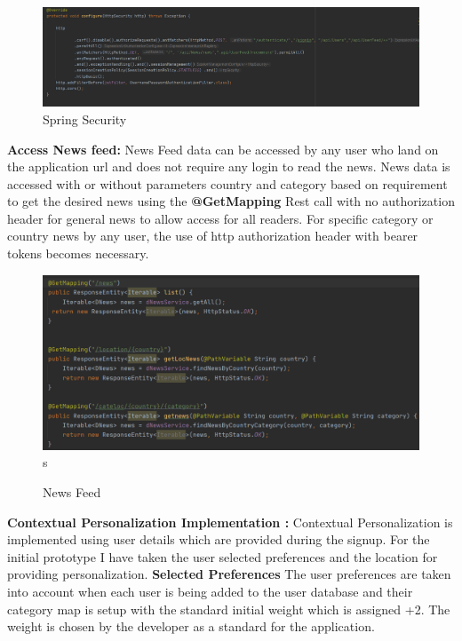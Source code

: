     
\begin{figure}[h!]
     \begin{center}
    \includegraphics[width = \linewidth]{images/security.PNG} 
  \end{center}
\centering \caption{Spring Security}
\end{figure}

\textbf{ Access News feed: } \newline
News Feed data can be accessed by any user who land on the application url and does not require any login to read the news.
News data is accessed with or without parameters country and category based on requirement to get the desired news using the \textbf{@GetMapping} Rest call with no authorization header for general news to allow access for all readers. For specific category or country news by any user, the use of http authorization header with bearer tokens becomes necessary.

   
\begin{figure}[h!]
     \begin{center}
    \includegraphics[width = \linewidth]{images/AccessNews.PNG}s 
  \end{center}
\centering \caption{News Feed}
\end{figure}

 
\textbf{Contextual Personalization Implementation :}\newline
Contextual Personalization is implemented using user details which are provided during the signup. 
For the initial prototype I have taken the user selected preferences and the location for providing personalization.\newline
\textbf{Selected Preferences}\newline
The user preferences are taken into account when each user is being added to the user database and their category map is setup with the standard initial weight which is assigned +2. The weight is chosen by the developer as a standard for the application.\newline

